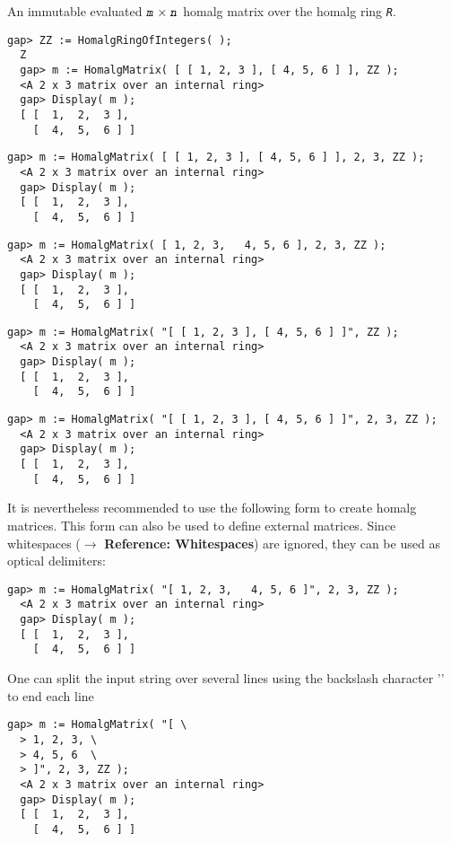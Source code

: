 \documentclass[a4paper,11pt]{report}
\begin{document}
{{{ An immutable evaluated $\mbox{\texttt{\slshape m}} \times \mbox{\texttt{\slshape n}}$ \textsf{homalg} matrix over the \textsf{homalg} ring \mbox{\texttt{\slshape R}}. 
\begin{Verbatim}[fontsize=\small,frame=single,label=Example]
  gap> ZZ := HomalgRingOfIntegers( );
  Z
  gap> m := HomalgMatrix( [ [ 1, 2, 3 ], [ 4, 5, 6 ] ], ZZ );
  <A 2 x 3 matrix over an internal ring>
  gap> Display( m );
  [ [  1,  2,  3 ],
    [  4,  5,  6 ] ]
\end{Verbatim}
 
\begin{Verbatim}[fontsize=\small,frame=single,label=Example]
  gap> m := HomalgMatrix( [ [ 1, 2, 3 ], [ 4, 5, 6 ] ], 2, 3, ZZ );
  <A 2 x 3 matrix over an internal ring>
  gap> Display( m );
  [ [  1,  2,  3 ],
    [  4,  5,  6 ] ]
\end{Verbatim}
 
\begin{Verbatim}[fontsize=\small,frame=single,label=Example]
  gap> m := HomalgMatrix( [ 1, 2, 3,   4, 5, 6 ], 2, 3, ZZ );
  <A 2 x 3 matrix over an internal ring>
  gap> Display( m );
  [ [  1,  2,  3 ],
    [  4,  5,  6 ] ]
\end{Verbatim}
 
\begin{Verbatim}[fontsize=\small,frame=single,label=Example]
  gap> m := HomalgMatrix( "[ [ 1, 2, 3 ], [ 4, 5, 6 ] ]", ZZ );
  <A 2 x 3 matrix over an internal ring>
  gap> Display( m );
  [ [  1,  2,  3 ],
    [  4,  5,  6 ] ]
\end{Verbatim}
 
\begin{Verbatim}[fontsize=\small,frame=single,label=Example]
  gap> m := HomalgMatrix( "[ [ 1, 2, 3 ], [ 4, 5, 6 ] ]", 2, 3, ZZ );
  <A 2 x 3 matrix over an internal ring>
  gap> Display( m );
  [ [  1,  2,  3 ],
    [  4,  5,  6 ] ]
\end{Verbatim}
 It is nevertheless recommended to use the following form to create \textsf{homalg} matrices. This form can also be used to define external matrices. Since
whitespaces ($\to$  \textbf{Reference: Whitespaces}) are ignored, they can be used as optical delimiters: 
\begin{Verbatim}[fontsize=\small,frame=single,label=Example]
  gap> m := HomalgMatrix( "[ 1, 2, 3,   4, 5, 6 ]", 2, 3, ZZ );
  <A 2 x 3 matrix over an internal ring>
  gap> Display( m );
  [ [  1,  2,  3 ],
    [  4,  5,  6 ] ]
\end{Verbatim}
 One can split the input string over several lines using the backslash
character '\texttt{}' to end each line 
\begin{Verbatim}[fontsize=\small,frame=single,label=Example]
  gap> m := HomalgMatrix( "[ \
  > 1, 2, 3, \
  > 4, 5, 6  \
  > ]", 2, 3, ZZ );
  <A 2 x 3 matrix over an internal ring>
  gap> Display( m );
  [ [  1,  2,  3 ],
    [  4,  5,  6 ] ]
\end{Verbatim}
 }

}}
\end{document}
